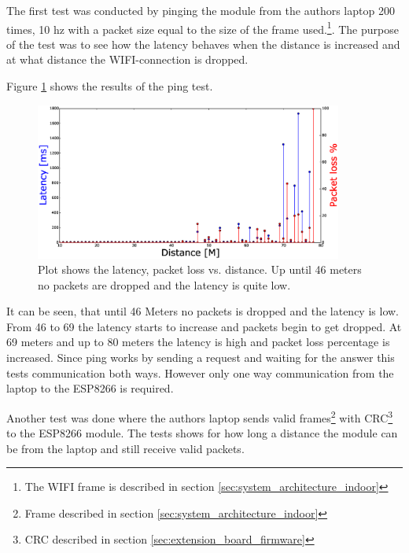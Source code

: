 The first test was conducted by pinging the module from the authors laptop 200 times, 10 hz with a packet size equal to the size of the frame used.\footnote{The WIFI frame is described in section \ref{sec:system_architecture_indoor}}. The purpose of the test was to see how the latency behaves when the distance is increased and at what distance the  WIFI-connection is dropped.

Figure \ref{fig:wifi_pingtest} shows the results of the ping test.

\begin{figure}[H]
    \center
    \includegraphics[width=0.9\textwidth]{graphics/wifi_test_latency_1.eps}
  \caption{Plot shows the latency, packet loss vs. distance. Up until 46 meters no packets are dropped and the latency is quite low.}
    \label{fig:wifi_pingtest}
\end{figure}

It can be seen, that until 46 Meters no packets is dropped and the latency is low. From 46 to 69 the latency starts to increase and packets begin to get dropped. At 69 meters and up to 80 meters the latency is high and packet loss percentage is increased. Since ping works by sending a request and waiting for the answer this tests communication both ways. However only one way communication from the laptop to the ESP8266 is required.

Another test was done where the authors laptop sends valid frames\footnote{Frame described in section \ref{sec:system_architecture_indoor}} with CRC\footnote{CRC described in section \ref{sec:extension_board_firmware}} to the ESP8266 module. The tests shows for how long a distance the module can be from the laptop and still receive valid packets. 

